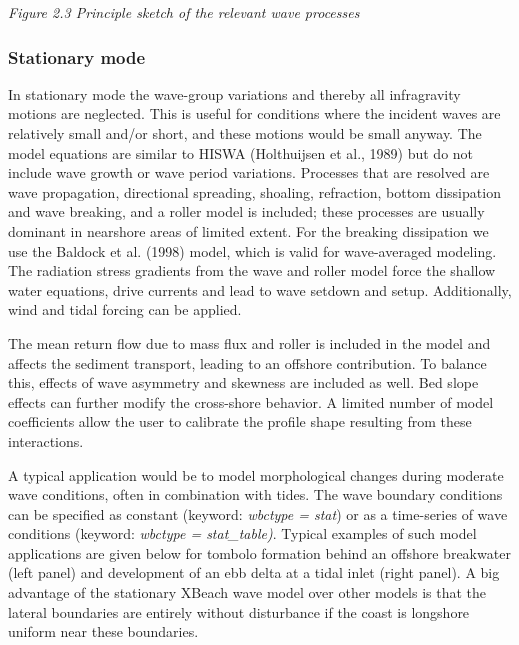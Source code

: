 \documentclass{article}
\begin{document}
\noindent \textit{Figure 2.3 Principle sketch of the relevant wave processes}


\subsubsection{ Stationary mode}

\noindent In stationary mode the wave-group variations and thereby all infragravity motions are neglected. This is useful for conditions where the incident waves are relatively small and/or short, and these motions would be small anyway. The model equations are similar to HISWA (Holthuijsen et al., 1989) but do not include wave growth or wave period variations. Processes that are resolved are wave propagation, directional spreading, shoaling, refraction, bottom dissipation and wave breaking, and a roller model is included; these processes are usually dominant in nearshore areas of limited extent. For the breaking dissipation we use the Baldock et al. (1998) model, which is valid for wave-averaged modeling. The radiation stress gradients from the wave and roller model force the shallow water equations, drive currents and lead to wave setdown and setup. Additionally, wind and tidal forcing can be applied. 

\noindent The mean return flow due to mass flux and roller is included in the model and affects the sediment transport, leading to an offshore contribution. To balance this, effects of wave asymmetry and skewness are included as well. Bed slope effects can further modify the cross-shore behavior. A limited number of model coefficients allow the user to calibrate the profile shape resulting from these interactions.  

\noindent 

\noindent A typical application would be to model morphological changes during moderate wave conditions, often in combination with tides. The wave boundary conditions can be specified as constant (keyword: \textit{wbctype = stat}) or as a time-series of wave conditions (keyword: \textit{wbctype = stat\_table)}. Typical examples of such model applications are given below for tombolo formation behind an offshore breakwater (left panel) and development of an ebb delta at a tidal inlet (right panel). A big advantage of the stationary XBeach wave model over other models is that the lateral boundaries are entirely without disturbance if the coast is longshore uniform near these boundaries.

\noindent 
\end{document}
